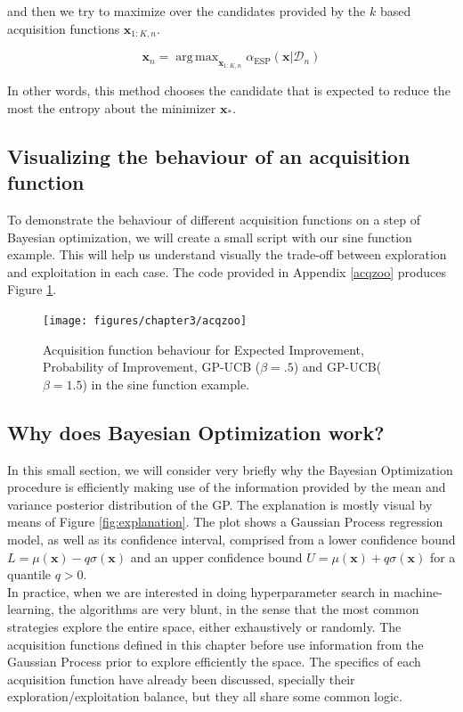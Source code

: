 \documentclass[10pt,a4paper,twoside]{book}
\DeclareMathOperator*{\argmax}{arg\,max}
\begin{document}
and then we try to maximize over the candidates provided by the $k$ based acquisition functions $\boldsymbol{x}_{1:K, n}$.

\begin{equation}
\boldsymbol{x}_n = \argmax_{\boldsymbol{x}_{1:K, n}} \alpha_{\mathrm{ESP}}(\boldsymbol{x}|\mathcal{D}_n)
\end{equation}

In other words, this method chooses the candidate that is expected to reduce the most the entropy about the minimizer $\boldsymbol{x}_*$. 

\subsection{Visualizing the behaviour of an acquisition function}

To demonstrate the behaviour of different acquisition functions on a step of Bayesian optimization, we will create a small script with our sine function example. This will help us understand visually the trade-off between exploration and exploitation in each case. The code provided in Appendix \ref{acqzoo} produces Figure \ref{fig:acqzoo}.


\begin{figure}
\centering
\caption{Acquisition function behaviour for Expected Improvement, Probability of Improvement, GP-UCB ($\beta = .5$) and GP-UCB($\beta = 1.5$) in the sine function example.}
\label{fig:acqzoo}
\texttt{[image: figures/chapter3/acqzoo]}
\end{figure}

\subsection{Why does Bayesian Optimization work?}

In this small section, we will consider very briefly why the Bayesian Optimization procedure is efficiently making use of the information provided by the mean and variance posterior distribution of the GP. The explanation is mostly visual by means of Figure \ref{fig:explanation}. The plot shows a Gaussian Process regression model, as well as its confidence interval, comprised from a lower confidence bound $L = \mu(\boldsymbol{x}) - q\sigma(\boldsymbol{x})$ and an upper confidence bound $U = \mu(\boldsymbol{x}) + q\sigma(\boldsymbol{x})$ for a quantile $q>0$.\\

In practice, when we are interested in doing hyperparameter search in machine-learning, the algorithms are very blunt, in the sense that the most common strategies explore the entire space, either exhaustively or randomly. The acquisition functions defined in this chapter before use information from the Gaussian Process prior to explore efficiently the space. The specifics of each acquisition function have already been discussed, specially their exploration/exploitation balance, but they all share some common logic.\\
\end{document}
